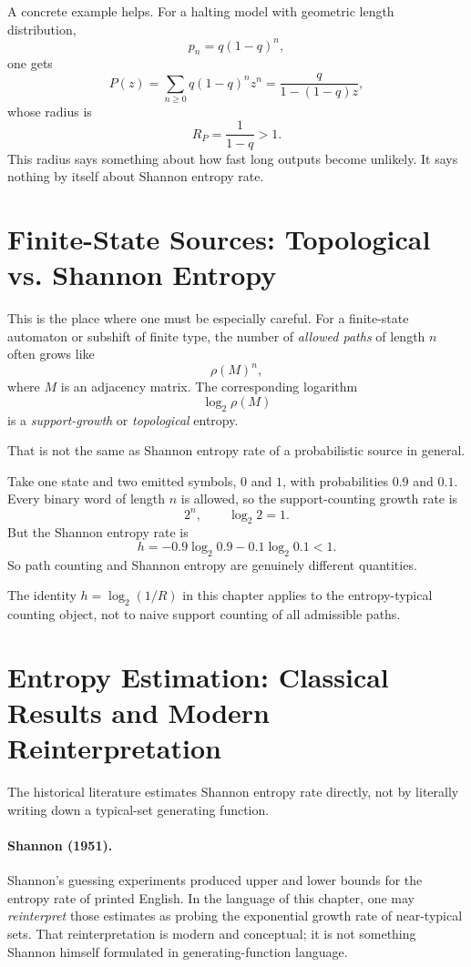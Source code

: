 A concrete example helps. For a halting model with geometric length distribution,
\[
  p_n = q(1-q)^n,
\]
one gets
\[
  P(z) = \sum_{n \ge 0} q(1-q)^n z^n = \frac{q}{1-(1-q)z},
\]
whose radius is
\[
  R_P = \frac{1}{1-q} > 1.
\]
This radius says something about how fast long outputs become unlikely. It says nothing by itself about Shannon entropy rate.

\section{Finite-State Sources: Topological vs. Shannon Entropy}

This is the place where one must be especially careful. For a finite-state automaton or subshift of finite type, the number of \emph{allowed paths} of length $n$ often grows like
\[
  \rho(M)^n,
\]
where $M$ is an adjacency matrix. The corresponding logarithm
\[
  \log_2 \rho(M)
\]
is a \emph{support-growth} or \emph{topological} entropy.

That is not the same as Shannon entropy rate of a probabilistic source in general.

\begin{example}
Take one state and two emitted symbols, $0$ and $1$, with probabilities $0.9$ and $0.1$. Every binary word of length $n$ is allowed, so the support-counting growth rate is
\[
  2^n,
  \qquad
  \log_2 2 = 1.
\]
But the Shannon entropy rate is
\[
  h = -0.9\log_2 0.9 - 0.1\log_2 0.1 < 1.
\]
So path counting and Shannon entropy are genuinely different quantities.
\end{example}

The identity $h = \log_2(1/R)$ in this chapter applies to the entropy-typical counting object, not to naive support counting of all admissible paths.

\section[Entropy Estimation]{Entropy Estimation: Classical Results and Modern Reinterpretation}

The historical literature estimates Shannon entropy rate directly, not by literally writing down a typical-set generating function.

\paragraph{Shannon (1951).}
Shannon's guessing experiments \cite{Shannon1951} produced upper and lower bounds for the entropy rate of printed English. In the language of this chapter, one may \emph{reinterpret} those estimates as probing the exponential growth rate of near-typical sets. That reinterpretation is modern and conceptual; it is not something Shannon himself formulated in generating-function language.

